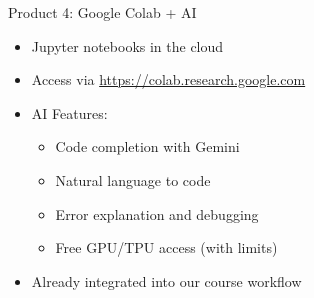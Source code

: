 \documentclass{beamer}
\begin{document}
\begin{frame}{Product 4: Google Colab + AI}
\begin{itemize}
    \item Jupyter notebooks in the cloud
    \item Access via \url{https://colab.research.google.com}
    \item AI Features:
    \begin{itemize}
        \item Code completion with Gemini
        \item Natural language to code
        \item Error explanation and debugging
        \item Free GPU/TPU access (with limits)
    \end{itemize}
    \item Already integrated into our course workflow
\end{itemize}
\end{frame}
\end{document}
